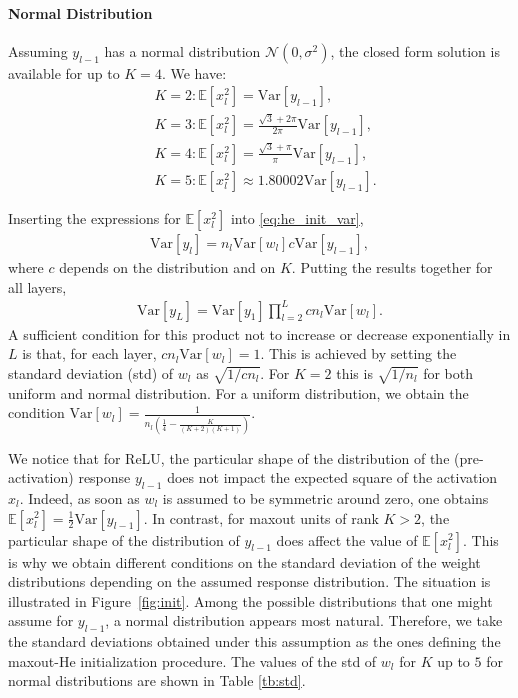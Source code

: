 \documentclass{article}
\theoremstyle{definition}
\newcommand{\var}{\mathrm{Var}}
\begin{document}
    \paragraph{Normal Distribution}
    Assuming $y_{l-1}$ has a normal distribution $\mathcal{N} (0, \sigma^2)$, the closed form solution is available for up to $K = 4$. We have:
    \begin{align*}
        &K = 2: \mathbb{E}[x_l^2] = \var[y_{l-1}],\\
        &K = 3: \mathbb{E}[x_l^2] = \frac{\sqrt{3} + 2 \pi}{2 \pi}\var[y_{l-1}],\\
        &K = 4: \mathbb{E}[x_l^2] = \frac{\sqrt{3} + \pi}{\pi}\var[y_{l-1}],\\
        &K = 5: \mathbb{E}[x_l^2] \approx 1.80002 \var[y_{l-1}].
    \end{align*}
    
    Inserting the expressions for $\mathbb{E}[x_l^2]$ into \eqref{eq:he_init_var}, 
    \begin{align*}
        \var[y_l] = n_l \var[w_l] c \var[y_{l-1}],
    \end{align*}
    where $c$ depends on the distribution and on $K$.
    Putting the results together for all layers,
    \begin{align*}
        \var[y_L] = \var[y_1] \prod_{l = 2}^L c n_l \var [w_l].
    \end{align*}
    A sufficient condition for this product not to increase or decrease exponentially in $L$ is that, for each layer, $c n_l \var [w_l] = 1$. This is achieved by setting the standard deviation (std) of $w_l$ as $\sqrt{1/c n_l}$. 
    For $K=2$ this is $\sqrt{1/n_l}$ for both uniform and normal distribution. 
    For a uniform distribution, we obtain the condition $\var[w_l] = \frac{1}{n_l (\frac{1}{4} - \frac{K}{(K+2)(K+1)})}$. 

We notice that for ReLU, the particular shape of the distribution of the (pre-activation) response $y_{l-1}$ does not impact the expected square of the activation $x_l$. Indeed, as soon as $w_l$ is assumed to be symmetric around zero, one obtains $\mathbb{E}[x_l^2] = \frac12 \var[y_{l-1}]$. 
%
In contrast, for maxout units of rank $K>2$, the particular shape of the distribution of $y_{l-1}$ does affect the value of $\mathbb{E}[x_l^2]$. This is why we obtain different conditions on the standard deviation of the weight distributions depending on the assumed response distribution. 
The situation is illustrated in Figure~\ref{fig:init}. 
%
    Among the possible distributions that one might assume for $y_{l-1}$, a normal distribution appears most natural. Therefore, we take the standard deviations obtained under this assumption as the ones defining the maxout-He initialization procedure. 
    The values of the std of $w_l$ for $K$ up to $5$ for normal distributions are shown in Table \ref{tb:std}. 
\end{document}
